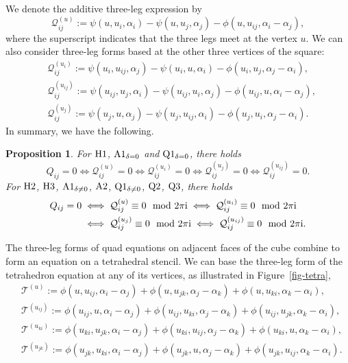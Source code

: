\documentclass[10pt,a4paper]{amsart}
\newtheorem{Proposition}[Definition]{Proposition}
\numberwithin{equation}{section}
\begin{document}
We denote the additive three-leg expression by
\begin{equation*}
	\mathcal{Q}_{ij}^{(u)} := \psi(u,u_i,\alpha_i) - \psi(u,u_j,\alpha_j) - \phi(u,u_{ij}, \alpha_i-\alpha_j) ,
\end{equation*}
where the superscript indicates that the three legs meet at the vertex $u$. We can also consider three-leg forms based at the other three vertices of the square:
\begin{align}
	&\mathcal{Q}_{ij}^{(u_i)}:= \psi(u_i,u_{ij},\alpha_j) - \psi(u_i,u,\alpha_i) - \phi(u_i,u_j, \alpha_j-\alpha_i) , \label{quad-ui}\\
	&\mathcal{Q}_{ij}^{(u_{ij})}:= \psi(u_{ij},u_j,\alpha_i) - \psi(u_{ij},u_i,\alpha_j) - \phi(u_{ij},u, \alpha_i-\alpha_j) , \label{quad-uij}\\
	&\mathcal{Q}_{ij}^{(u_j)}:= \psi(u_j,u,\alpha_j) - \psi(u_j,u_{ij},\alpha_i) - \phi(u_j,u_i, \alpha_j-\alpha_i) . \label{quad-uj}
\end{align}
In summary, we have the following.

\begin{Proposition} \label{prop-three-leg-quad}
 For ${\rm H}1$, ${\rm A}1_{\delta=0}$ and ${\rm Q}1_{\delta=0}$, there holds
 \[ Q_{ij} = 0 \iff \mathcal{Q}_{ij}^{(u)} = 0 \iff \mathcal{Q}_{ij}^{(u_i)} = 0 \iff \mathcal{Q}_{ij}^{(u_j)} = 0 \iff \mathcal{Q}_{ij}^{(u_{ij})} = 0 .\]
 For ${\rm H}2$, ${\rm H}3$, ${\rm A}1_{\delta\neq0}$, ${\rm A}2$, ${\rm Q}1_{\delta\neq0}$, ${\rm Q}2$, ${\rm Q}3$, there holds
 \begin{align*} Q_{ij} = 0 &\iff \mathcal{Q}_{ij}^{(u)} \equiv 0 \mod 2 \pi {\rm i} \iff \mathcal{Q}_{ij}^{(u_i)} \equiv 0 \mod 2 \pi {\rm i} \\
 &\iff \mathcal{Q}_{ij}^{(u_j)} \equiv 0 \mod 2 \pi {\rm i} \iff
 \mathcal{Q}_{ij}^{(u_{ij})} \equiv 0 \mod 2 \pi {\rm i} .
 \end{align*}
\end{Proposition}

The three-leg forms of quad equations on adjacent faces of the cube combine to form an equation on a tetrahedral stencil. We can base the three-leg form of the tetrahedron equation at any of its vertices, as illustrated in Figure~\ref{fig-tetra},
\begin{align}
 &\mathcal{T}^{(u)}:= \phi(u,u_{ij},\alpha_i-\alpha_j) + \phi(u,u_{jk},\alpha_j-\alpha_k) + \phi(u,u_{ki},\alpha_k-\alpha_i) , \label{tetra-u}\\
	&\mathcal{T}^{(u_{ij})}:= \phi(u_{ij},u,\alpha_i-\alpha_j) + \phi(u_{ij},u_{ki},\alpha_j-\alpha_k) + \phi(u_{ij},u_{jk}, \alpha_k-\alpha_i) , \label{tetra-uij}\\
	&\mathcal{T}^{(u_{ki})}:= \phi(u_{ki},u_{jk},\alpha_i-\alpha_j) + \phi(u_{ki},u_{ij},\alpha_j-\alpha_k) + \phi(u_{ki},u, \alpha_k-\alpha_i) , \label{tetra-uki}\\
	&\mathcal{T}^{(u_{jk})}:= \phi(u_{jk},u_{ki},\alpha_i-\alpha_j) + \phi(u_{jk},u,\alpha_j-\alpha_k) + \phi(u_{jk},u_{ij}, \alpha_k-\alpha_i) . \label{tetra-ujk}
\end{align}
\end{document}
